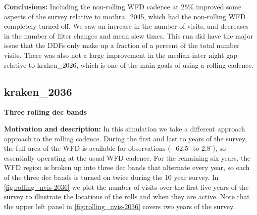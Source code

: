 \documentclass[DM,authoryear,toc]{lsstdoc}
\begin{document}
\textbf{Conclusions:} Including the non-rolling WFD cadence at $25\%$ improved some aspects of the survey
relative to mothra\_2045, which had the non-rolling WFD completely turned off. We saw an increase in the number of visits,
and decreases in the number of filter changes and mean slew times. This run did have the major issue that the DDFs only
make up a fraction of a percent of the total number visits. There was also not a large improvement in the median-inter night
gap relative to kraken\_2026, which is one of the main goals of using a rolling cadence.

\subsection{kraken\_2036} \label{kraken2036}

\textbf{Three rolling dec bands}

\textbf{Motivation and description:} In this simulation we take a different approach approach to the rolling cadence. During
the first and last to years of the survey, the full area of the WFD is available for observations ($-62.5^{\circ}$ to $2.8^{\circ}$), so essentially
operating at the usual WFD cadence. For the remaining six years, the WFD region is broken up into three dec bands that alternate every year,
so each of the three dec bands is turned on twice during the 10 year survey. In \autoref{fig:rolling_nvis-2036}
we plot the number of visits over the first five years of the survey to illustrate the locations of the rolls and when they are active. Note that
the upper left panel in \autoref{fig:rolling_nvis-2036} covers two years of the survey.
\end{document}
